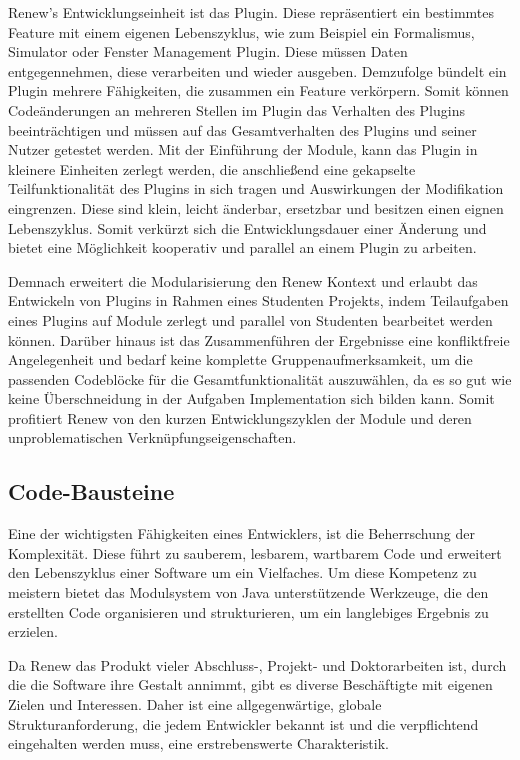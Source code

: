 Renew's Entwicklungseinheit ist das Plugin. Diese repräsentiert ein bestimmtes Feature mit einem eigenen Lebenszyklus, wie zum Beispiel ein Formalismus, Simulator oder Fenster Management Plugin. Diese müssen Daten entgegennehmen, diese verarbeiten und wieder ausgeben. Demzufolge bündelt ein Plugin mehrere Fähigkeiten, die zusammen ein Feature verkörpern. Somit können Codeänderungen an mehreren Stellen im Plugin das Verhalten des Plugins beeinträchtigen und müssen auf das Gesamtverhalten des Plugins und seiner Nutzer getestet werden. Mit der Einführung der Module, kann das Plugin in kleinere Einheiten zerlegt werden, die anschließend eine gekapselte Teilfunktionalität des Plugins in sich tragen und Auswirkungen der Modifikation eingrenzen. Diese sind klein, leicht änderbar, ersetzbar und besitzen einen eignen Lebenszyklus. Somit verkürzt sich die Entwicklungsdauer einer Änderung und bietet eine Möglichkeit kooperativ und parallel an einem Plugin zu arbeiten. \newline

Demnach erweitert die Modularisierung den Renew Kontext und erlaubt das Entwickeln von Plugins in Rahmen eines Studenten Projekts, indem Teilaufgaben eines Plugins auf Module zerlegt und parallel von Studenten bearbeitet werden können. Darüber hinaus ist das Zusammenführen der Ergebnisse eine konfliktfreie Angelegenheit und bedarf keine komplette Gruppenaufmerksamkeit, um die passenden Codeblöcke für die Gesamtfunktionalität auszuwählen, da es so gut wie keine Überschneidung in der Aufgaben Implementation sich bilden kann. Somit profitiert Renew von den kurzen Entwicklungszyklen der Module und deren unproblematischen Verknüpfungseigenschaften. 

\subsection{Code-Bausteine}\label{sub:cbs}
Eine der wichtigsten Fähigkeiten eines Entwicklers, ist die Beherrschung der Komplexität. Diese führt zu sauberem, lesbarem, wartbarem Code und erweitert den Lebenszyklus einer Software um ein Vielfaches. Um diese Kompetenz zu meistern bietet das Modulsystem von Java unterstützende Werkzeuge, die den erstellten Code organisieren und strukturieren, um ein langlebiges Ergebnis zu erzielen.  \newline

Da Renew das Produkt vieler Abschluss-, Projekt- und Doktorarbeiten ist, durch die die Software ihre Gestalt annimmt, gibt es diverse Beschäftigte mit eigenen Zielen und Interessen. Daher ist eine allgegenwärtige, globale Strukturanforderung, die jedem Entwickler bekannt ist und die verpflichtend eingehalten werden muss, eine erstrebenswerte Charakteristik.  \newline

